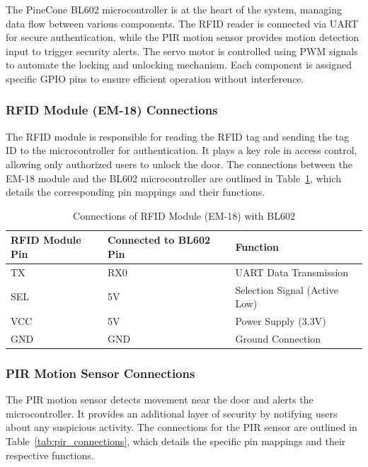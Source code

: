 \documentclass[a4paper]{scrartcl}
\begin{document}
The PineCone BL602 microcontroller is at the heart of the system, managing data flow between various components. The RFID reader is connected via UART for secure authentication, while the PIR motion sensor provides motion detection input to trigger security alerts. The servo motor is controlled using PWM signals to automate the locking and unlocking mechanism. Each component is assigned specific GPIO pins to ensure efficient operation without interference.



\subsubsection{RFID Module (EM-18) Connections}
The RFID module is responsible for reading the RFID tag and sending the tag ID to the microcontroller for authentication. It plays a key role in access control, allowing only authorized users to unlock the door. The connections between the EM-18 module and the BL602 microcontroller are outlined in Table~\ref{tab:rfid_connections}, which details the corresponding pin mappings and their functions.


\begin{table}[H]
    \centering
    \begin{tabular}{|l|l|l|}
        \hline
        \textbf{RFID Module Pin} & \textbf{Connected to BL602 Pin} & \textbf{Function} \\
        \hline
        TX & RX0 & UART Data Transmission \\
        SEL & 5V & Selection Signal (Active Low) \\
        VCC & 5V & Power Supply (3.3V) \\
        GND & GND & Ground Connection \\
        \hline
    \end{tabular}
    \caption{Connections of RFID Module (EM-18) with BL602}
    \label{tab:rfid_connections}
\end{table}

\subsubsection{PIR Motion Sensor Connections}
The PIR motion sensor detects movement near the door and alerts the microcontroller. It provides an additional layer of security by notifying users about any suspicious activity. The connections for the PIR sensor are outlined in Table~\ref{tab:pir_connections}, which details the specific pin mappings and their respective functions.
\end{document}
